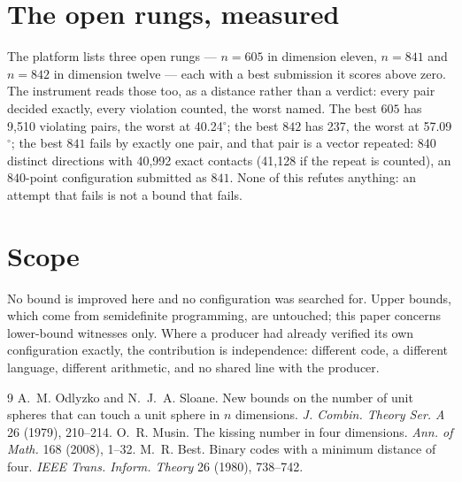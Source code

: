 \documentclass[11pt]{article}
\begin{document}
\section{The open rungs, measured}

The platform lists three open rungs --- $n = 605$ in dimension eleven, $n = 841$
and $n = 842$ in dimension twelve --- each with a best submission it scores above
zero. The instrument reads those too, as a distance rather than a verdict:
every pair decided exactly, every violation counted, the worst named. The best
$605$ has 9,510 violating pairs, the worst at
40.24$^\circ$; the best $842$ has
237, the worst at
57.09$^\circ$; the best $841$ fails by exactly
one pair, and that pair is a vector repeated: 840 distinct
directions with 40,992 exact contacts (41,128 if the repeat is counted), an $840$-point
configuration submitted as $841$. None of this refutes anything: an attempt that
fails is not a bound that fails.

\section{Scope}

No bound is improved here and no configuration was searched for. Upper bounds,
which come from semidefinite programming, are untouched; this paper concerns
lower-bound witnesses only. Where a producer had already verified its own
configuration exactly, the contribution is independence: different code, a
different language, different arithmetic, and no shared line with the producer.


\begin{thebibliography}{9}\small
{} A.~M. Odlyzko and N.~J.~A. Sloane. New bounds on the number of
unit spheres that can touch a unit sphere in $n$ dimensions.
\emph{J. Combin. Theory Ser. A} 26 (1979), 210--214.
 O.~R. Musin. The kissing number in four dimensions.
\emph{Ann. of Math.} 168 (2008), 1--32.
 M.~R. Best. Binary codes with a minimum distance of four.
\emph{IEEE Trans. Inform. Theory} 26 (1980), 738--742.
\end{thebibliography}
\end{document}
